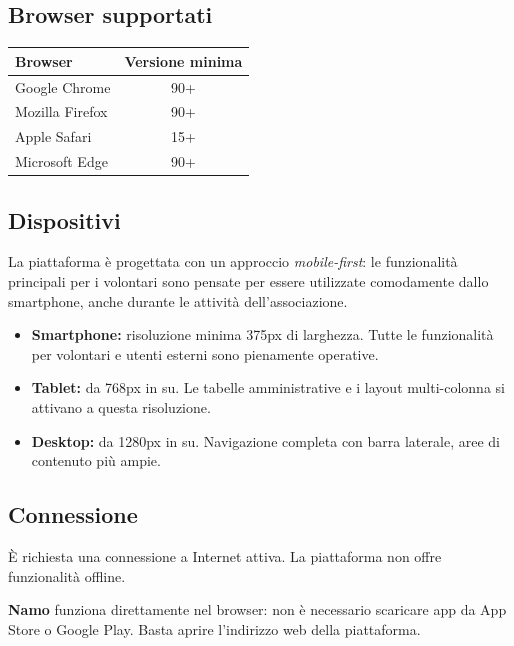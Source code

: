 \documentclass[a4paper,11pt,oneside]{book}
\newcommand{\namo}{\textbf{Namo}}
\begin{document}
\subsection{Browser supportati}

\begin{table}[htbp]
\centering
\begin{tabularx}{0.7\textwidth}{X c}
\toprule
\textbf{Browser} & \textbf{Versione minima} \\
\midrule
Google Chrome       & 90+ \\
Mozilla Firefox     & 90+ \\
Apple Safari        & 15+ \\
Microsoft Edge      & 90+ \\
\bottomrule
\end{tabularx}
\end{table}

\subsection{Dispositivi}

La piattaforma \`e progettata con un approccio \textit{mobile-first}: le funzionalit\`a principali per i volontari sono pensate per essere utilizzate comodamente dallo smartphone, anche durante le attivit\`a dell'associazione.

\begin{itemize}[leftmargin=1.5em]
  \item \textbf{Smartphone:} risoluzione minima 375px di larghezza. Tutte le funzionalit\`a per volontari e utenti esterni sono pienamente operative.
  \item \textbf{Tablet:} da 768px in su. Le tabelle amministrative e i layout multi-colonna si attivano a questa risoluzione.
  \item \textbf{Desktop:} da 1280px in su. Navigazione completa con barra laterale, aree di contenuto pi\`u ampie.
\end{itemize}

\subsection{Connessione}

\`E richiesta una connessione a Internet attiva. La piattaforma non offre funzionalit\`a offline.

\begin{infobox}
\namo{} funziona direttamente nel browser: non \`e necessario scaricare app da App Store o Google Play. Basta aprire l'indirizzo web della piattaforma.
\end{infobox}
\end{document}
